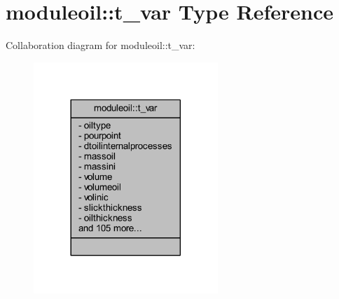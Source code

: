 \hypertarget{structmoduleoil_1_1t__var}{}\section{moduleoil\+:\+:t\+\_\+var Type Reference}
\label{structmoduleoil_1_1t__var}


Collaboration diagram for moduleoil\+:\+:t\+\_\+var\+:\nopagebreak
\begin{figure}[H]
\begin{center}
\leavevmode
\includegraphics[width=197pt]{structmoduleoil_1_1t__var__coll__graph}
\end{center}
\end{figure}
